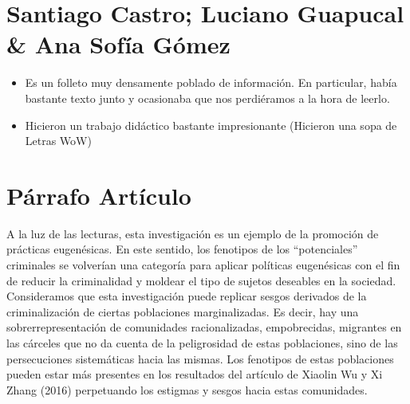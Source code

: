 \documentclass[12pt]{exam}
\begin{document}
\section{Santiago Castro; Luciano Guapucal \& Ana Sofía Gómez }

\begin{itemize}
  \item Es un folleto muy densamente poblado de información. En particular, había bastante texto junto y ocasionaba que nos perdiéramos a la hora de leerlo.
  \item Hicieron un trabajo didáctico bastante impresionante (Hicieron una sopa de Letras WoW)
\end{itemize}

\section{Párrafo Artículo}

A la luz de las lecturas, esta investigación es un ejemplo de la promoción de prácticas eugenésicas. En este sentido, los fenotipos de los “potenciales” criminales se volverían una categoría para aplicar políticas eugenésicas con el fin de reducir la criminalidad y moldear el tipo de sujetos deseables en la sociedad. Consideramos que esta investigación puede replicar sesgos derivados de la criminalización de ciertas poblaciones marginalizadas. Es decir, hay una sobrerrepresentación de comunidades racionalizadas, empobrecidas, migrantes en las cárceles que no da cuenta de la peligrosidad de estas poblaciones, sino de las persecuciones sistemáticas hacia las mismas. Los fenotipos de estas poblaciones pueden estar más presentes en los resultados del artículo de Xiaolin Wu y Xi Zhang (2016) perpetuando los estigmas y sesgos hacia estas comunidades.  
\end{document}
